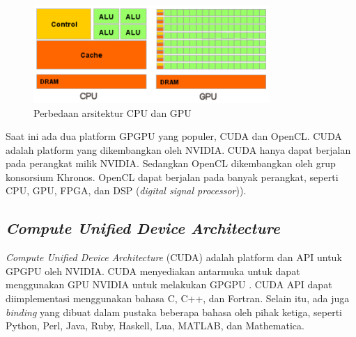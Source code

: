   \begin{figure}[htb]
    \centering
    \includegraphics[width=0.8\textwidth]{resources/GPUvsCPU.png}
    \caption[Perbedaan arsitektur CPU dan GPU]{Perbedaan arsitektur CPU dan GPU \citep{cuda}}
  \end{figure}



  Saat ini ada dua platform GPGPU yang populer, CUDA dan OpenCL. CUDA adalah platform yang dikembangkan oleh NVIDIA. CUDA hanya dapat berjalan pada perangkat milik NVIDIA. Sedangkan OpenCL dikembangkan oleh grup konsorsium Khronos. OpenCL dapat berjalan pada banyak perangkat, seperti CPU, GPU, FPGA, dan DSP (\emph{digital signal processor})).

  \subsection{\emph{Compute Unified Device Architecture}}

    \emph{Compute Unified Device Architecture} (CUDA) adalah platform dan API untuk GPGPU oleh NVIDIA. CUDA menyediakan antarmuka untuk dapat menggunakan GPU NVIDIA untuk melakukan GPGPU \citep{cuda}. CUDA API dapat diimplementasi menggunakan bahasa C, C++, dan Fortran. Selain itu, ada juga \emph{binding} yang dibuat dalam pustaka beberapa bahasa oleh pihak ketiga, seperti Python, Perl, Java, Ruby, Haskell, Lua, MATLAB, dan Mathematica.

